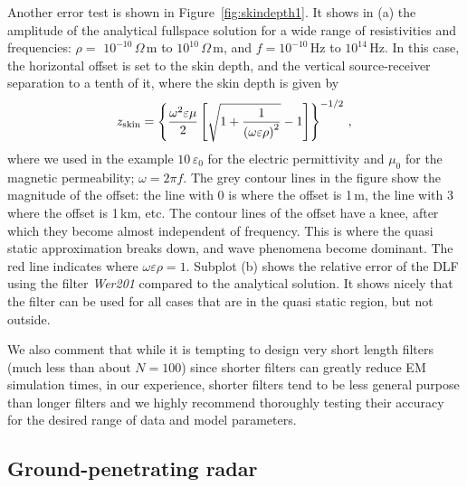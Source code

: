 \documentclass[paper,twocolumn,twoside]{geophysics}
\newcommand{\mr}[1]{\mathrm{#1}}
\begin{document}
Another error test is shown in Figure~\ref{fig:skindepth1}. It shows in (a) the
amplitude of the analytical fullspace solution for a wide range of
resistivities and frequencies: $\rho=$ $10^{-10}\,\Omega\,$m to
$10^{10}\,\Omega\,$m, and $f =10^{-10}$\,Hz to $10^{14}$\,Hz. In this case, the
horizontal offset is set to the skin depth, and the vertical source-receiver
separation to a tenth of it, where the skin depth is given by \citep[e.g., ][
equation~1.49]{B.SEG.88.Ward}
%
\begin{equation}
  z_\mr{skin} = \left\{\frac{\omega^2 \varepsilon\mu}{2}
    \left[ \sqrt{1 + \frac{1}{\left(\omega\varepsilon\rho\right)^2}} -1\right]
  \right\}^{-1/2} \, , \\
  \label{eq:skin}
\end{equation}
%
where we used in the example $10\,\varepsilon_0$ for the electric permittivity
and $\mu_0$ for the magnetic permeability; $\omega = 2\pi f$. The grey contour
lines in the figure show the magnitude of the offset: the line with 0 is where
the offset is 1\,m, the line with 3 where the offset is 1\,km, etc. The contour
lines of the offset have a knee, after which they become almost independent of
frequency. This is where the quasi static approximation breaks down, and wave
phenomena become dominant. The red line indicates where $\omega\varepsilon\rho
= 1$. Subplot (b) shows the relative error of the DLF using the filter
\emph{Wer201} compared to the analytical solution. It shows nicely that the
filter can be used for all cases that are in the quasi static region, but not
outside.
%
%

We also comment that while it is tempting to design very short length
filters (much less than about $N=100$) since shorter filters can greatly reduce
EM simulation times, in our experience, shorter filters tend to be less general
purpose than longer filters and we highly recommend thoroughly testing their
accuracy for the desired range of data and model parameters.


\subsection{Ground-penetrating radar}
\end{document}
